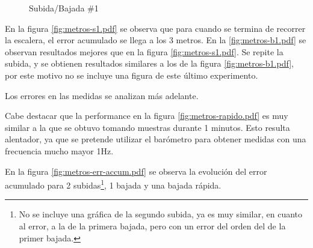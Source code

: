 \documentclass[main]{subfiles}
\begin{document}
\begin{figure}[h!]
\centering
{}
\caption{Subida/Bajada \#1}
\end{figure}

En la figura \ref{fig:metros-s1.pdf} se observa que para cuando se termina de recorrer la escalera, el error acumulado se llega a los 3 metros. En la \ref{fig:metros-b1.pdf} se observan resultados mejores que en la figura \ref{fig:metros-s1.pdf}. Se repite la subida, y se obtienen resultados similares a los de la figura \ref{fig:metros-b1.pdf}, por este motivo no se incluye una figura de este último experimento.

Los errores en las medidas se analizan más adelante.

Cabe destacar que la performance en la figura \ref{fig:metros-rapido.pdf} es muy similar a la que se obtuvo tomando muestras durante 1 minutos. Esto resulta alentador, ya que se pretende utilizar el barómetro para obtener medidas con una frecuencia mucho mayor 1Hz.

En la figura \ref{fig:metros-err-accum.pdf} se observa la evolución del error acumulado para 2 subidas\footnote{No se incluye una gráfica de la segundo subida, ya es muy similar, en cuanto al error, a la de la primera bajada, pero con un error del orden del de la primer bajada.}, 1 bajada y una bajada rápida.
\end{document}
